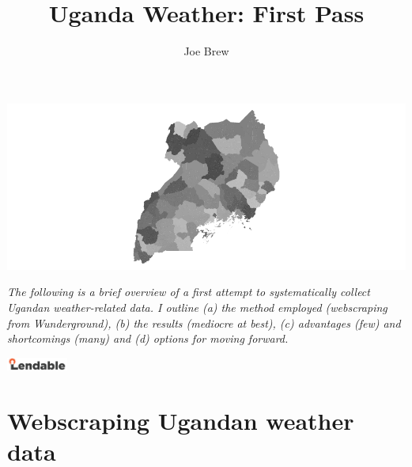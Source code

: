 \documentclass[11pt]{article}
\begin{document}


\title{\textbf{Uganda Weather: First Pass}}
\author{Joe Brew}


\maketitle

\includegraphics{uganda_weather_first_pass-001}

\emph{
\noindent The following is a brief overview of a first attempt to systematically collect Ugandan weather-related data.  I outline (a) the method employed (webscraping from Wunderground), (b) the results (mediocre at best), (c) advantages (few) and shortcomings (many) and (d) options for moving forward. }
\tableofcontents

\vspace{20mm}

\begin{center}
\includegraphics[width=2cm]{logo}
\end{center}




\section*{Webscraping Ugandan weather data}
\hrulefill
\end{document}
